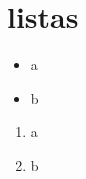 \section{listas}
\begin{itemize}
        \item a
        \item b
\end{itemize}

\begin{enumerate}
        \item a
        \item b
\end{enumerate}

